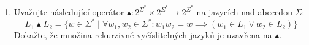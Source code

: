 \documentclass[11pt, a4paper]{article}
\newcommand{\aprefix}[1]{#1_{a\textit{-pre}}}
\newcommand{\asuffix}[1]{#1_{a\textit{-suf}}}
\theoremstyle{result}
\newtheorem*{result}{Řešení}
\begin{document}
\begin{enumerate}
\begin{result}
\begin{enumerate}[(1)]
            \item Výpočet $\aprefix{N}$ (krok \ref{naa-resolve-prefix}):
            \begin{align*}
                \aprefix{N}^0 &= \emptyset \\
                \aprefix{N}^1 &= \{Y\} \\
                \aprefix{N}^2 &= \{S, Y\} = \aprefix{N}^3 = \aprefix{N}
            \end{align*}
            
            \item Výpočet $\asuffix{N}$ (krok \ref{naa-resolve-suffix}):
            \begin{align*}
                \asuffix{N}^0 &= \emptyset \\
                \asuffix{N}^1 &= \{X\} \\
                \asuffix{N}^2 &= \{S, X\} = \asuffix{N}^3 = \asuffix{N}
            \end{align*}
            
            \item Samotný výpočet $N_{aa}$ (kroky \ref{naa-init}, \ref{naa-iter} a \ref{naa-finish}):
            \begin{align*}
                N_{aa}^0 &= \emptyset \\
                N_{aa}^1 &= \{S\} = N_{aa}^2 = N_{aa}
            \end{align*}
            
        \end{enumerate}
    \end{result}
    
    
    
    
    
    \item
    Uvažujte následující operátor $\blacktriangle: 2^{\Sigma^*} \times 2^{\Sigma^*} \rightarrow 2^{\Sigma^*}$ na jazycích nad abecedou $\Sigma$:
    $$L_1 \blacktriangle L_2 = \{w \in \Sigma^* \mid \forall w_1, w_2 \in \Sigma^*: w_1w_2 = w \implies (w_1 \in L_1 \lor w_2 \in L_2)\}$$
    Dokažte, že množina rekurzivně vyčíslitelných jazyků je uzavřena na $\blacktriangle$.
    

\end{enumerate}
\end{document}
